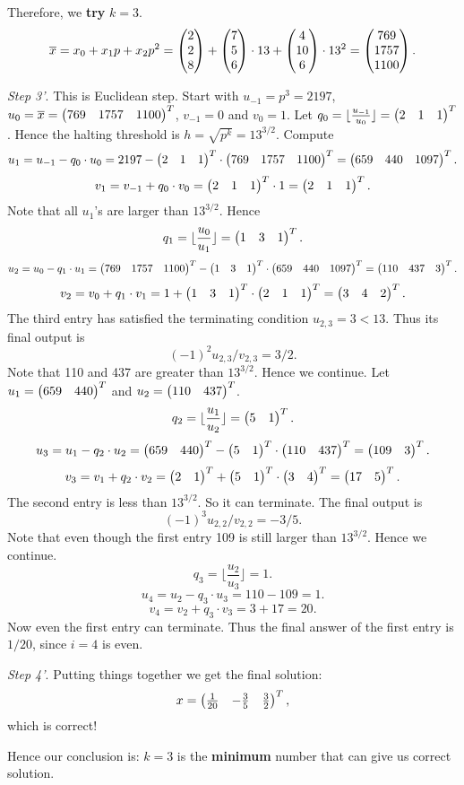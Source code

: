 \documentclass[12pt]{article}
\theoremstyle{plain}
\begin{document}
Therefore, we {\bf try} $k=3$.
$$\overline{x} = x_0 + x_1p+x_2p^2 = \begin{pmatrix}2\\2\\8\end{pmatrix} + \begin{pmatrix}7\\5\\6\end{pmatrix} \cdot 13 + \begin{pmatrix}4\\10\\6\end{pmatrix} \cdot 13^2 = \begin{pmatrix}769\\1757\\1100\end{pmatrix}.$$

\emph{Step 3'}. This is Euclidean step. Start with $u_{-1} = p^3 = 2197$, $u_0=\overline{x} = \begin{pmatrix}769& 1757& 1100\end{pmatrix}^T$, $v_{-1} = 0$ and $v_0=1$. Let $q_0 = \lfloor \frac{u_{-1}}{u_0} \rfloor = \begin{pmatrix}2 & 1 & 1\end{pmatrix}^T$. Hence the halting threshold is $h = \sqrt{p^k} = 13^{3/2}$. Compute
$$u_1 = u_{-1} - q_0\cdot u_0 = 2197 - \begin{pmatrix}2 & 1 & 1\end{pmatrix}^T \cdot \begin{pmatrix}769 & 1757 & 1100\end{pmatrix}^T = \begin{pmatrix}659 & 440 & 1097\end{pmatrix}^T.$$
$$v_1 = v_{-1} + q_0\cdot v_0 = \begin{pmatrix}2 & 1 & 1\end{pmatrix}^T \cdot 1 = \begin{pmatrix}2 & 1 & 1\end{pmatrix}^T.$$
Note that all $u_1$'s are larger than $13^{3/2}$. Hence
$$q_1 = \lfloor \frac{u_0}{u_1} \rfloor = \begin{pmatrix}1 & 3 & 1\end{pmatrix}^T.$$
$$u_2 = u_0 - q_1\cdot u_1 = \begin{pmatrix}769&1757&1100\end{pmatrix}^T - \begin{pmatrix}1 & 3 & 1\end{pmatrix}^T \cdot \begin{pmatrix}659 & 440 & 1097\end{pmatrix}^T = \begin{pmatrix}110 & 437 & 3\end{pmatrix}^T.$$
$$v_2 = v_0 + q_1\cdot v_1 = 1 + \begin{pmatrix}1 & 3 & 1\end{pmatrix}^T \cdot \begin{pmatrix}2 & 1 & 1\end{pmatrix}^T = \begin{pmatrix}3&4&2\end{pmatrix}^T.$$
The third entry has satisfied the terminating condition $u_{2,3} = 3 < 13$. Thus its final output is 
$$(-1)^2u_{2,3}/v_{2,3} = 3/2.$$
Note that 110 and 437 are greater than $13^{3/2}$. Hence we continue. Let $u_1 = \begin{pmatrix}659 & 440\end{pmatrix}^T$ and $u_2 = \begin{pmatrix}110 & 437\end{pmatrix}^T$.
$$q_2 = \lfloor \frac{u_1}{u_2} \rfloor = \begin{pmatrix}5 & 1\end{pmatrix}^T.$$
$$u_3 = u_1 - q_2\cdot u_2 = \begin{pmatrix}659 & 440\end{pmatrix}^T - \begin{pmatrix}5 & 1\end{pmatrix}^T \cdot \begin{pmatrix}110 & 437\end{pmatrix}^T = \begin{pmatrix}109 & 3\end{pmatrix}^T.$$
$$v_3 = v_1 + q_2\cdot v_2 = \begin{pmatrix}2 & 1\end{pmatrix}^T + \begin{pmatrix}5 & 1\end{pmatrix}^T \cdot \begin{pmatrix}3&4\end{pmatrix}^T = \begin{pmatrix}17 & 5\end{pmatrix}^T.$$
The second entry is less than $13^{3/2}$. So it can terminate. The final output is 
$$(-1)^3u_{2,2}/v_{2,2} = -3/5.$$
Note that even though the first entry 109 is still larger than $13^{3/2}$. Hence we continue. 
$$q_3 = \lfloor \frac{u_2}{u_3} \rfloor = 1.$$
$$u_4 = u_2 - q_3\cdot u_3 = 110 - 109 = 1.$$
$$v_4 = v_2 + q_3\cdot v_3 = 3 + 17 = 20.$$
Now even the first entry can terminate. Thus the final answer of the first entry is $1/20$, since $i=4$ is even.

\emph{Step 4'}. Putting things together we get the final solution:
$$x = \begin{pmatrix}\frac{1}{20} & -\frac{3}{5} & \frac{3}{2}\end{pmatrix}^T,$$
which is correct!

Hence our conclusion is: $k=3$ is the {\bf minimum} number that can give us correct solution.
\end{document}
